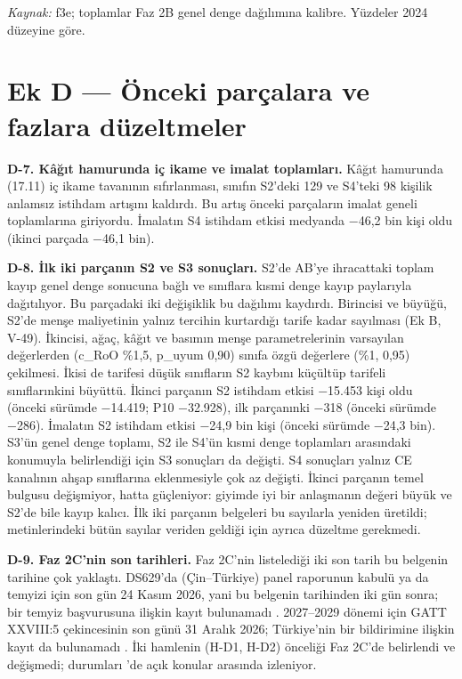 \endgroup

\emph{Kaynak:} \etiketT{} f3e; toplamlar Faz 2B genel denge dağılımına kalibre. Yüzdeler 2024 düzeyine göre.

\hypertarget{nace_kartlar_16-18-ek-d--uxf6nceki-paruxe7alara-ve-fazlara-duxfczeltmeler}{%
\section{Ek D --- Önceki parçalara ve fazlara düzeltmeler}\label{nace_kartlar_16-18-ek-d--uxf6nceki-paruxe7alara-ve-fazlara-duxfczeltmeler}}

\textbf{D-7. Kâğıt hamurunda iç ikame ve imalat toplamları.} Kâğıt hamurunda (17.11) iç ikame tavanının sıfırlanması, sınıfın S2'deki 129 ve S4'teki 98 kişilik anlamsız istihdam artışını kaldırdı. Bu artış önceki parçaların imalat geneli toplamlarına giriyordu. İmalatın S4 istihdam etkisi medyanda −46,2 bin kişi oldu (ikinci parçada −46,1 bin).

\textbf{D-8. İlk iki parçanın S2 ve S3 sonuçları.} S2'de AB'ye ihracattaki toplam kayıp genel denge sonucuna bağlı ve sınıflara kısmi denge kayıp paylarıyla dağıtılıyor. Bu parçadaki iki değişiklik bu dağılımı kaydırdı. Birincisi ve büyüğü, S2'de menşe maliyetinin yalnız tercihin kurtardığı tarife kadar sayılması (Ek B, V-49). İkincisi, ağaç, kâğıt ve basımın menşe parametrelerinin varsayılan değerlerden (c\_RoO \%1,5, p\_uyum 0,90) sınıfa özgü değerlere (\%1, 0,95) çekilmesi. İkisi de tarifesi düşük sınıfların S2 kaybını küçültüp tarifeli sınıflarınkini büyüttü. İkinci parçanın S2 istihdam etkisi −15.453 kişi oldu (önceki sürümde −14.419; P10 −32.928), ilk parçanınki −318 (önceki sürümde −286). İmalatın S2 istihdam etkisi −24,9 bin kişi (önceki sürümde −24,3 bin). S3'ün genel denge toplamı, S2 ile S4'ün kısmi denge toplamları arasındaki konumuyla belirlendiği için S3 sonuçları da değişti. S4 sonuçları yalnız CE kanalının ahşap sınıflarına eklenmesiyle çok az değişti. İkinci parçanın temel bulgusu değişmiyor, hatta güçleniyor: giyimde iyi bir anlaşmanın değeri büyük ve S2'de bile kayıp kalıcı. İlk iki parçanın belgeleri bu sayılarla yeniden üretildi; metinlerindeki bütün sayılar veriden geldiği için ayrıca düzeltme gerekmedi.

\textbf{D-9. Faz 2C'nin son tarihleri.} Faz 2C'nin listelediği iki son tarih bu belgenin tarihine çok yaklaştı. DS629'da (Çin--Türkiye) panel raporunun kabulü ya da temyizi için son gün 24 Kasım 2026, yani bu belgenin tarihinden iki gün sonra; bir temyiz başvurusuna ilişkin kayıt bulunamadı \etiketD{}. 2027--2029 dönemi için GATT XXVIII:5 çekincesinin son günü 31 Aralık 2026; Türkiye'nin bir bildirimine ilişkin kayıt da bulunamadı \etiketD{}. İki hamlenin (H-D1, H-D2) önceliği Faz 2C'de belirlendi ve değişmedi; durumları 'de açık konular arasında izleniyor.

